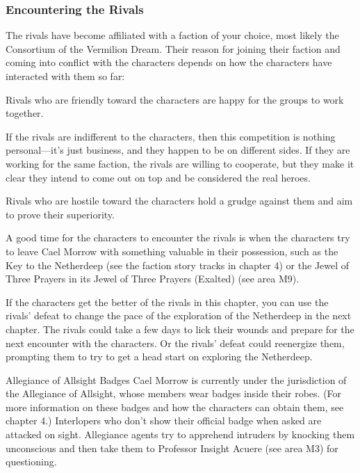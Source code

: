 \documentclass[10pt,a4paper,twoside,twocolumn,openany,nodeprecatedcode]{dndbook}
\begin{document}
\subsubsection{Encountering the Rivals}
The rivals have become affiliated with a faction of your choice, most likely the Consortium of the Vermilion Dream. Their reason for joining their faction and coming into conflict with the characters depends on how the characters have interacted with them so far:


\begin{description}[nolistsep]
\item[Friendly Rivals.]
Rivals who are friendly toward the characters are happy for the groups to work together.
\item[Indifferent Rivals.]
If the rivals are indifferent to the characters, then this competition is nothing personal—it's just business, and they happen to be on different sides. If they are working for the same faction, the rivals are willing to cooperate, but they make it clear they intend to come out on top and be considered the real heroes.
\item[Hostile Rivals.]
Rivals who are hostile toward the characters hold a grudge against them and aim to prove their superiority.
\end{description}

A good time for the characters to encounter the rivals is when the characters try to leave Cael Morrow with something valuable in their possession, such as the Key to the Netherdeep (see the faction story tracks in chapter 4) or the Jewel of Three Prayers in its Jewel of Three Prayers (Exalted) (see area M9).

If the characters get the better of the rivals in this chapter, you can use the rivals' defeat to change the pace of the exploration of the Netherdeep in the next chapter. The rivals could take a few days to lick their wounds and prepare for the next encounter with the characters. Or the rivals' defeat could reenergize them, prompting them to try to get a head start on exploring the Netherdeep.

\begin{DndSidebar}[float=!b]{Allegiance of Allsight Badges}
Cael Morrow is currently under the jurisdiction of the Allegiance of Allsight, whose members wear badges inside their robes. (For more information on these badges and how the characters can obtain them, see chapter 4.) Interlopers who don't show their official badge when asked are attacked on sight. Allegiance agents try to apprehend intruders by knocking them unconscious and then take them to Professor Insight Acuere (see area M3) for questioning.
\end{DndSidebar}
\end{document}
